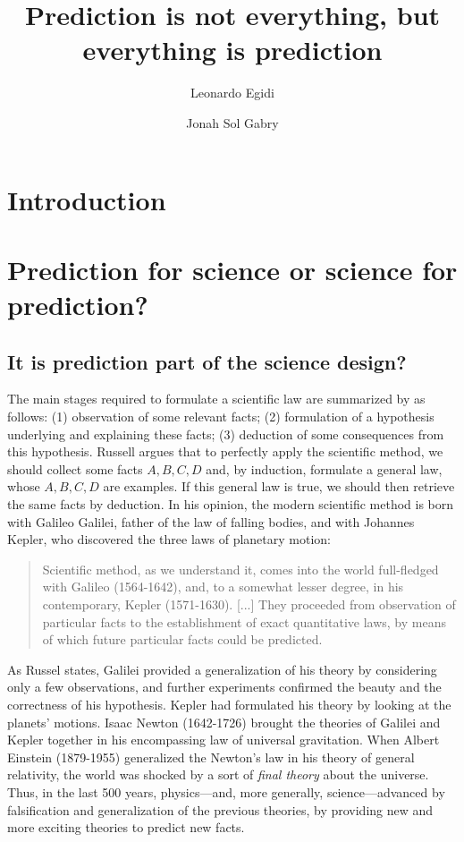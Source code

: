 \documentclass{statsoc}
\title[]{Prediction is not everything, but everything is prediction}
\author[Egidi and Gabry]{Leonardo Egidi}
\author[Egidi and Gabry]{Jonah Sol Gabry}
\begin{document}
\maketitle

\begin{abstract}


\end{abstract}

\section{Introduction}

\section{Prediction for science or science for prediction?}

\subsection{It is prediction part of the science design?}

\color{black}

The main stages required to formulate a scientific law are summarized by \cite{russell2017scientific} as follows:
(1) observation of some relevant facts;
(2) formulation of a hypothesis underlying and explaining these facts;
(3) deduction of some consequences from this hypothesis.
Russell argues that to perfectly apply the scientific method, we should collect some facts $A, B, C,D$ and, by induction, formulate a general law, whose $A, B, C, D$ are examples. If this general law is true, we should then retrieve the same facts by deduction.  
In his opinion, the modern scientific method is born with Galileo Galilei, father of the law of falling bodies, and with Johannes Kepler, who discovered the three laws of planetary motion:
 \begin{quote}
Scientific method, as we understand it, comes into the
world full-fledged with Galileo (1564-1642), and, to a
somewhat lesser degree, in his contemporary, Kepler
(1571-1630). [...] They proceeded from observation of
particular facts to the establishment of exact quantitative
laws, by means of which future particular facts could be
predicted.
\end{quote}
%
As Russel states, Galilei provided a generalization of his theory by considering only a few observations, and further experiments confirmed the beauty and the correctness of his 
hypothesis. Kepler had formulated his theory by looking at the planets' motions. Isaac Newton (1642-1726) brought the theories of Galilei and Kepler together in his encompassing 
law of universal gravitation. When Albert Einstein (1879-1955) generalized the Newton's law in his theory of general relativity, the world was shocked by a sort of \emph{final 
theory} about the universe. Thus, in the last 500 years, physics---and, more generally, science---advanced by falsification and generalization of the previous theories, by providing new and more exciting theories to predict new facts.
\end{document}

